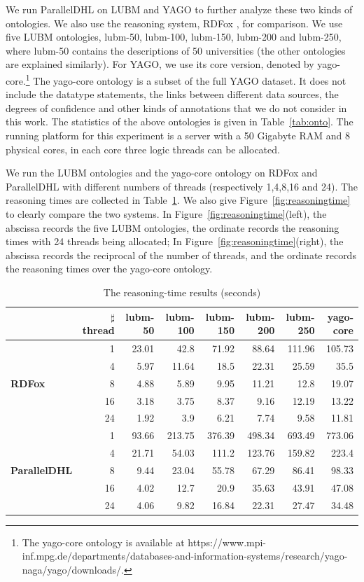 We run ParallelDHL on LUBM and YAGO to further analyze these
two kinds of ontologies. We also use the reasoning system, RDFox \cite{MotikNPHO14},
for comparison. We use five LUBM ontologies, lubm-50, lubm-100, lubm-150, lubm-200
and lubm-250, where lubm-50 contains the descriptions of 50 universities (the other ontologies
are explained similarly). For YAGO, we use its core version, denoted by yago-core.\footnote{
The yago-core ontology is available at https://www.mpi-inf.mpg.de/departments/databases-and-information-systems/research/yago-naga/yago/downloads/.}
The yago-core ontology is a subset of the full YAGO dataset. It does not include the datatype statements, the links
between different data sources, the degrees of confidence and other kinds of
annotations that we do not consider in this work. The statistics of the above ontologies is given in Table~\ref{tab:onto}.
The running platform for this experiment is a server with a 50 Gigabyte RAM and 8 physical cores, in each core
three logic threads can be allocated.

We run the LUBM ontologies and the yago-core ontology on RDFox and ParallelDHL with different numbers of
threads (respectively 1,4,8,16 and 24).
The reasoning times are collected in Table~\ref{tab:result}. We also give Figure~\ref{fig:reasoningtime} to
clearly compare the two systems.
In Figure~\ref{fig:reasoningtime}(left), the abscissa records the five LUBM ontologies,
the ordinate records the reasoning times with 24 threads being allocated;
In Figure~\ref{fig:reasoningtime}(right), the abscissa records the reciprocal of the number of threads, and
the ordinate records the reasoning times over the yago-core ontology.


\begin{table}
\centering
\caption{The reasoning-time results (seconds)}
\begin{tabular}{|l|r|r|r|r|r|r|r|}
\hline
&\small$\sharp$thread&lubm-50&lubm-100&lubm-150&lubm-200&lubm-250&yago-core\\
\hline
\multirow{5}{*}{ \textbf{RDFox}}&1&23.01&42.8&71.92&88.64&111.96&105.73\\
                    &4&5.97&11.64&18.5&22.31&25.59&35.5\\
                    &8&4.88&5.89&9.95&11.21&12.8&19.07\\
                    &16&3.18&3.75&8.37&9.16&12.19&13.22\\
                    &24&1.92&3.9&6.21&7.74&9.58&11.81\\
\hline
\multirow{5}{*}{ \small{\textbf{ParallelDHL}}}&1&93.66&213.75&376.39&498.34&693.49&773.06\\
                    &4&21.71&54.03&111.2&123.76&159.82&223.4\\
                    &8&9.44&23.04&55.78&67.29&86.41&98.33\\
                    &16&4.02&12.7&20.9&35.63&43.91&47.08\\
                    &24&4.06&9.82&16.84&22.31&27.47&34.48\\
\hline
\end{tabular}
\label{tab:result}
\end{table}

